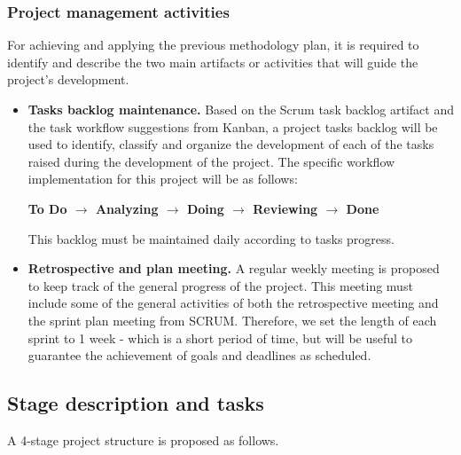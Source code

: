 \documentclass[11pt]{article}
\begin{document}
\subsubsection{Project management activities}

For achieving and applying the previous methodology plan, it is required to identify and describe the two main artifacts or activities that will guide the project's development.

\begin{itemize}
\item \textbf{Tasks backlog maintenance.} Based on the Scrum task backlog artifact and the task workflow suggestions from Kanban, a project tasks backlog will be used to identify, classify and organize the development of each of the tasks raised during the development of the project. The specific workflow implementation for this project will be as follows:
\begin{center}
\textbf{To Do $\rightarrow$ Analyzing $\rightarrow$ Doing $\rightarrow$ Reviewing $\rightarrow$ Done}
\end{center}
This backlog must be maintained daily according to tasks progress.
\item \textbf{Retrospective and plan meeting.} A regular weekly meeting is proposed to keep track of the general progress of the project. This meeting must include some of the general activities of both the retrospective meeting and the sprint plan meeting from SCRUM. Therefore, we set the length of each sprint to 1 week - which is a short period of time, but will be useful to guarantee the achievement of goals and deadlines as scheduled.
\end{itemize}

\subsection{Stage description and tasks}
\label{sec:stage}

A 4-stage project structure is proposed as follows.
\end{document}
